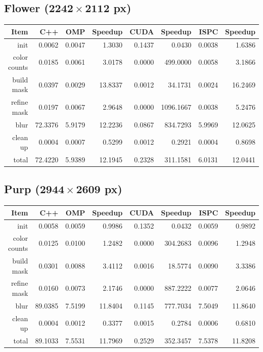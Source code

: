 \documentclass[12pt]{article}
\begin{document}
\subsection{Flower ($\mathbf{2242 \times 2112}$ px)}

\begin{tabular}{r|r|r|r|r|r|r|r}
    Item & C++ & OMP & Speedup & CUDA & Speedup & ISPC & Speedup
\\  \hline
    init & 0.0062 & 0.0047 & 1.3030 & 0.1437 & 0.0430 & 0.0038 & 1.6386
\\  color counts & 0.0185 & 0.0061 & 3.0178 & 0.0000 & 499.0000 & 0.0058 & 3.1866
\\  build mask & 0.0397 & 0.0029 & 13.8337 & 0.0012 & 34.1731 & 0.0024 & 16.2469
\\  refine mask & 0.0197 & 0.0067 & 2.9648 & 0.0000 & 1096.1667 & 0.0038 & 5.2476
\\  blur & 72.3376 & 5.9179 & 12.2236 & 0.0867 & 834.7293 & 5.9969 & 12.0625
\\  clean up & 0.0004 & 0.0007 & 0.5299 & 0.0012 & 0.2921 & 0.0004 & 0.8698
\\  \hline
    total & 72.4220 & 5.9389 & 12.1945 & 0.2328 & 311.1581 & 6.0131 & 12.0441
\end{tabular}

\subsection{Purp ($\mathbf{2944 \times 2609}$ px)}

\begin{tabular}{r|r|r|r|r|r|r|r}
    Item & C++ & OMP & Speedup & CUDA & Speedup & ISPC & Speedup
\\  \hline
    init & 0.0058 & 0.0059 & 0.9986 & 0.1352 & 0.0432 & 0.0059 & 0.9892
\\  color counts & 0.0125 & 0.0100 & 1.2482 & 0.0000 & 304.2683 & 0.0096 & 1.2948
\\  build mask & 0.0301 & 0.0088 & 3.4112 & 0.0016 & 18.5774 & 0.0090 & 3.3386
\\  refine mask & 0.0160 & 0.0073 & 2.1746 & 0.0000 & 887.2222 & 0.0077 & 2.0646
\\  blur & 89.0385 & 7.5199 & 11.8404 & 0.1145 & 777.7034 & 7.5049 & 11.8640
\\  clean up & 0.0004 & 0.0012 & 0.3377 & 0.0015 & 0.2784 & 0.0006 & 0.6810
\\  \hline
    total & 89.1033 & 7.5531 & 11.7969 & 0.2529 & 352.3457 & 7.5378 & 11.8208
\end{tabular}
\end{document}
